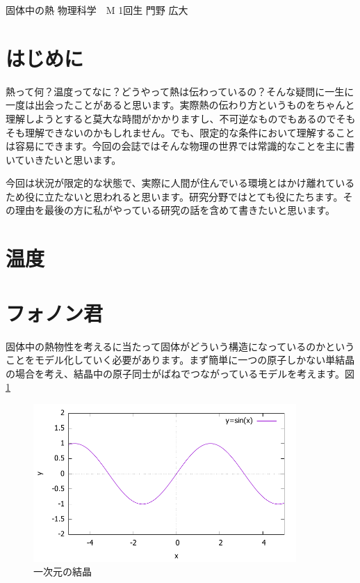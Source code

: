 \documentclass[10pt,b5paper,papersize,dvipdfmx]{jsbook}
\begin{document}

\kaishititle%
  {固体中の熱}%
  {物理科学　M 1回生}%
  {門野 広大}%


\section*{はじめに}
熱って何？温度ってなに？どうやって熱は伝わっているの？そんな疑問に一生に一度は出会ったことがあると思います。実際熱の伝わり方というものをちゃんと理解しようとすると莫大な時間がかかりますし、不可逆なものでもあるのでそもそも理解できないのかもしれません。でも、限定的な条件において理解することは容易にできます。今回の会誌ではそんな物理の世界では常識的なことを主に書いていきたいと思います。\par
今回は状況が限定的な状態で、実際に人間が住んでいる環境とはかけ離れているため役に立たないと思われると思います。研究分野ではとても役にたちます。その理由を最後の方に私がやっている研究の話を含めて書きたいと思います。


%
\section{温度}



\section{フォノン君}
固体中の熱物性を考えるに当たって固体がどういう構造になっているのかということをモデル化していく必要があります。まず簡単に一つの原子しかない単結晶の場合を考え、結晶中の原子同士がばねでつながっているモデルを考えます。図\ref{fig:bane}
\begin{figure}[htbp]
  \centering
  \includegraphics[width=10cm]{temp/fig-sin.pdf}
  \caption{一次元の結晶}
  \label{fig:bane}
\end{figure}
\end{document}
